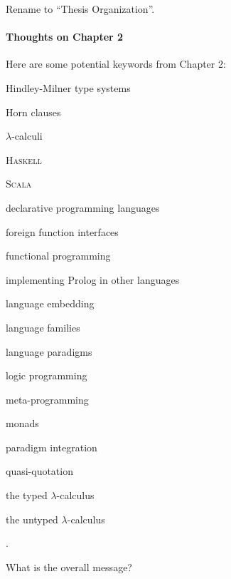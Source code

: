 \begin{scope}
Rename to ``Thesis Organization''.

\paragraph{Thoughts on Chapter 2}

Here are some potential keywords from Chapter 2:
\begin{inparaitem}
\item Hindley-Milner type systems
\item Horn clauses
\item \(\lambda\)-calculi
\item \textsc{Haskell}
\item \textsc{Scala}
\item declarative programming languages
\item foreign function interfaces
\item functional programming
\item implementing Prolog in other languages
\item language embedding
\item language families
\item language paradigms
\item logic programming
\item meta-programming
\item monads
\item paradigm integration
\item quasi-quotation
\item the typed \(\lambda\)-calculus
\item the untyped \(\lambda\)-calculus
\end{inparaitem}.

What is the overall message?


\end{scope}
